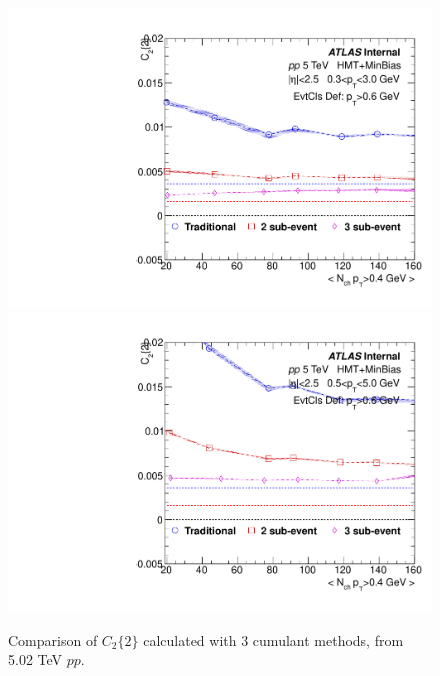 \begin{figure}[p]
\includegraphics[width=0.4\linewidth]{figs/sec_result/pp5/phy_2PC_Har0_Pt0_Cls3.pdf}
\includegraphics[width=0.4\linewidth]{figs/sec_result/pp5/phy_2PC_Har0_Pt1_Cls3.pdf}
\caption{Comparison of $C_{2}\{2\}$ calculated with 3 cumulant methods, from 5.02 TeV $pp$.}
\label{fig:result_pp5_C22}
\end{figure}
\clearpage

